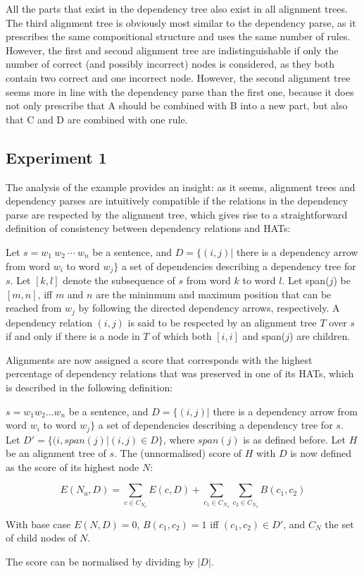 All the parts that exist in the dependency tree also exist in all alignment trees. The third alignment tree is obviously most similar to the dependency parse, as it prescribes the same compositional structure and uses the same number of rules. However, the first and second alignment tree are indistinguishable if only the number of correct (and possibly incorrect) nodes is considered, as they both contain two correct and one incorrect node. However, the second alignment tree seems more in line with the dependency parse than the first one, because it does not only prescribe that A should be combined with B into a new part, but also that C and D are combined with one rule.

\subsection{Experiment 1}

The analysis of the example provides an insight: as it seems, alignment trees and dependency parses are intuitively compatible if the relations in the dependency parse are respected by the alignment tree, which gives rise to a straightforward definition of consistency between dependency relations and HATs:

\begin{definition}\label{def:depHAT}
Let $s = w_1~w_2~\cdots~w_n$ be a sentence, and $D = \{ (i,j) |$ there is a dependency arrow from word $w_i$ to word $w_j \}$ a set of dependencies describing a dependency tree for $s$. Let $[k,l]$ denote the subsequence of $s$ from word $k$ to word $l$. Let span($j$) be $[m,n]$, iff $m$ and $n$ are the mininmum and maximum position that can be reached from $w_j$ by following the directed dependency arrows, respectively. A dependency relation $(i,j)$ is said to be respected by an alignment tree $T$ over $s$ if and only if there is a node in $T$ of which both $[i,i]$ and span($j$) are children.
\end{definition}

Alignments are now assigned a score that corresponds with the highest percentage of dependency relations that was preserved in one of its HATs, which is described in the following definition:

\begin{definition}
 $s = w_1 w_2 \dots w_n$ be a sentence, and $D = \{ (i,j) |$ there is a dependency arrow from word $w_i$ to word $w_j \}$ a set of dependencies describing a dependency tree for $s$. Let $D' = \{(i,span(j) | (i,j)\in D\}$, where $span(j)$ is as defined before. Let $H$ be an alignment tree of $s$. The (unnormalised) score of $H$ with $D$ is now defined as the score of its highest node $N$:

$$
E(N_a,D) = \sum_{c\in C_{N_a}} E(c,D)+ \sum_{c_1\in C_{N_a}} \sum_{c_2\in C_{N_a}} B(c_1,c_2)
$$

\noindent With base case $E(N,D) = 0$, $B(c_1,c_2) = 1$ iff  $(c_1,c_2)\in D'$, and $C_N$ the set of child nodes of $N$.

The score can be normalised by dividing by $|D|$.
\end{definition}


